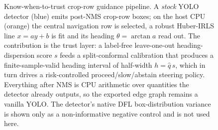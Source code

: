 \begin{figure}[!t]
{}
  \caption{Know-when-to-trust crop-row guidance pipeline. A \emph{stock} YOLO detector (blue) emits
  post-NMS crop-row boxes; on the host CPU (orange) the central navigation row is selected, a robust
  Huber-IRLS line $x=ay+b$ is fit and its heading $\theta=\arctan a$ read out. The contribution is the
  trust layer: a label-free leave-one-out heading-dispersion score $s$ feeds a split-conformal
  calibration that produces a finite-sample-valid heading interval of half-width $h=\hat q\,s$, which in
  turn drives a risk-controlled proceed/slow/abstain steering policy. Everything after NMS is CPU
  arithmetic over quantities the detector already outputs, so the exported edge graph remains a vanilla
  YOLO. The detector's native DFL box-distribution variance is shown only as a non-informative negative
  control and is not used here.}
  \label{fig:pipeline}
\end{figure}
